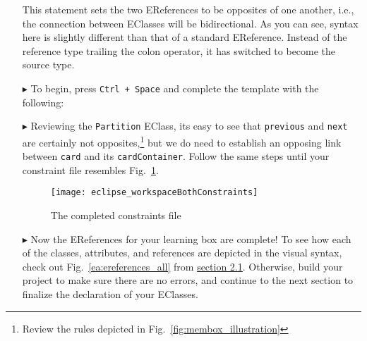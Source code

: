 \begin{itemize}
This statement sets the two EReferences to be opposites of one another, i.e., the connection between EClasses will be bidirectional. As you can see, syntax here
is slightly different than that of a standard EReference. Instead of the reference type trailing the colon operator, it has switched to become the source type.

\vspace{0.5cm}

\item[$\blacktriangleright$] To begin, press \texttt{Ctrl + Space} and complete
the template with the following:


\item[$\blacktriangleright$] Reviewing the \texttt{Partition} EClass, its easy to see that \texttt{previous} and \texttt{next} are certainly not
opposites,\footnote{Review the rules depicted in Fig.~\ref{fig:membox_illustration}} but we do need to establish an opposing link between
\texttt{card} and its \texttt{cardContainer}. Follow the same steps until your constraint file resembles Fig.~\ref{eclipse:bothConstraints}.

\begin{figure}[htbp]
	\centering
  \texttt{[image: eclipse\_workspaceBothConstraints]}
	\caption{The completed constraints file}
	\label{eclipse:bothConstraints}
\end{figure} 

\newpage

\item[$\blacktriangleright$] Now the EReferences for your learning box are complete! To see how each of the classes, attributes, and references
are depicted in the visual syntax, check out Fig.~\ref{ea:ereferences_all} from \hyperlink{sec:static vis}{section 2.1}. Otherwise, build your project to
make sure there are no errors, and continue to the next section to finalize the declaration of your EClasses.


\end{itemize}
